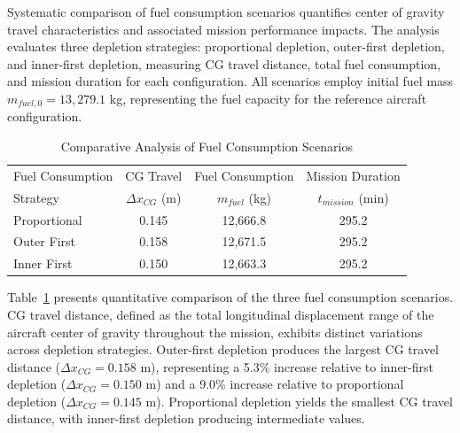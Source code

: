 Systematic comparison of fuel consumption scenarios quantifies center of gravity travel characteristics and associated mission performance impacts. The analysis evaluates three depletion strategies: proportional depletion, outer-first depletion, and inner-first depletion, measuring CG travel distance, total fuel consumption, and mission duration for each configuration. All scenarios employ initial fuel mass $m_{fuel,0} = 13,279.1$ kg, representing the fuel capacity for the reference aircraft configuration.


\begin{table}[h]
    \centering
    \footnotesize
    \begin{tabular}{l c c c}
        \hline
        Fuel Consumption & CG Travel & Fuel Consumption & Mission Duration \\
        Strategy & $\Delta x_{CG}$ (m) & $m_{fuel}$ (kg) & $t_{mission}$ (min) \\
        \hline
        Proportional & 0.145 & 12{,}666.8 & 295.2 \\
        Outer First & 0.158 & 12{,}671.5 & 295.2 \\
        Inner First & 0.150 & 12{,}663.3 & 295.2 \\
        \hline
    \end{tabular}
    \caption{Comparative Analysis of Fuel Consumption Scenarios}
    \label{tab:cg_consumption_scenario_comparison}
\end{table}

Table~\ref{tab:cg_consumption_scenario_comparison} presents quantitative comparison of the three fuel consumption scenarios. CG travel distance, defined as the total longitudinal displacement range of the aircraft center of gravity throughout the mission, exhibits distinct variations across depletion strategies. Outer-first depletion produces the largest CG travel distance ($\Delta x_{CG} = 0.158$ m), representing a 5.3\% increase relative to inner-first depletion ($\Delta x_{CG} = 0.150$ m) and a 9.0\% increase relative to proportional depletion ($\Delta x_{CG} = 0.145$ m). Proportional depletion yields the smallest CG travel distance, with inner-first depletion producing intermediate values.

